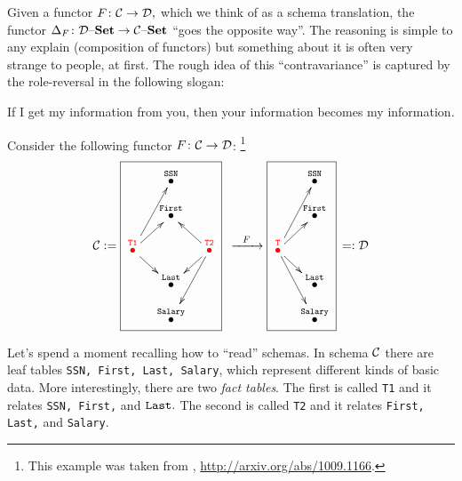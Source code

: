 \documentclass[../main/CT4S-EN-RU]{subfiles}
\begin{document}
\begin{blockRUS}
\end{blockRUS}

\begin{remarkENG}
Given a functor $F\colon\mathcal{C}\rightarrow\mathcal{D},$ which we think of as a schema translation, the functor $\Delta_F\colon\mathcal{D}{\text \textendash}{\mathbf{Set}}\rightarrow\mathcal{C}{\text \textendash}{\mathbf{Set}}$ “goes the opposite way”. The reasoning is simple to any explain (composition of functors) but something about it is often very strange to people, at first. The rough idea of this “contravariance” is captured by the role-reversal in the following slogan:
\end{remarkENG}

\begin{remarkRUS}
\end{remarkRUS}

\begin{sloganENG} 
If I get my information from you, then your information becomes my information. 
\end{sloganENG}

\begin{sloganRUS} 
\end{sloganRUS}

\begin{blockENG}
Consider the following functor $F\colon\mathcal{C}\rightarrow\mathcal{D}$: 
\footnote{This example was taken from \cite{Sp1}, \url{http://arxiv.org/abs/1009.1166}.}
\begin{align}\label{dia:translation}
\mcC:=\parbox{1.2in}{\fbox{\xymatrix@=10pt{&\LTO{SSN}\\&\LTO{First}\\\color{red}{\LTO{T1}}\ar[uur]\ar[ur]\ar[dr]&&\color{red}{\LTO{T2}}\ar[ul]\ar[dl]\ar[ddl]\\&\LTO{Last}\\&\LTO{Salary}}}}\Too{F}\parbox{.8in}{\fbox{\xymatrix@=10pt{&\LTO{SSN}\\&\LTO{First}\\\color{red}{\LTO{T}}\ar[uur]\ar[ur]\ar[dr]\ar[ddr]\\&\LTO{Last}\\&\LTO{Salary}}}}=:\mcD
\end{align}
\end{blockENG}

\begin{blockRUS}
\end{blockRUS}

\begin{blockENG}
Let's spend a moment recalling how to “read” schemas. In schema $\mathcal{C}$ there are leaf tables {\tt SSN, First, Last, Salary}, which represent different kinds of basic data. More interestingly, there are two {\em fact tables}. The first is called {\tt T1} and it relates {\tt SSN, First,} and ${\tt Last}.$ The second is called {\tt T2} and it relates {\tt First, Last,} and {\tt Salary}.
\end{blockENG}
\end{document}
